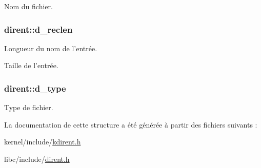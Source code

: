 Nom du fichier. \hypertarget{structdirent_a7cc67dd4ba5a8bed7f107f249957688d}{
\subsubsection[{d\+\_\+reclen}]{ dirent\+::d\+\_\+reclen}}\label{structdirent_a7cc67dd4ba5a8bed7f107f249957688d}
Longueur du nom de l'entrée.

Taille de l'entrée. \hypertarget{structdirent_a948760e3b7f607213a19f85e7af15a32}{
\subsubsection[{d\+\_\+type}]{ dirent\+::d\+\_\+type}}\label{structdirent_a948760e3b7f607213a19f85e7af15a32}
Type de fichier. 

La documentation de cette structure a été générée à partir des fichiers suivants \+:\begin{DoxyCompactItemize}
\item 
kernel/include/\hyperlink{kdirent_8h}{kdirent.\+h}\item 
libc/include/\hyperlink{dirent_8h}{dirent.\+h}\end{DoxyCompactItemize}
